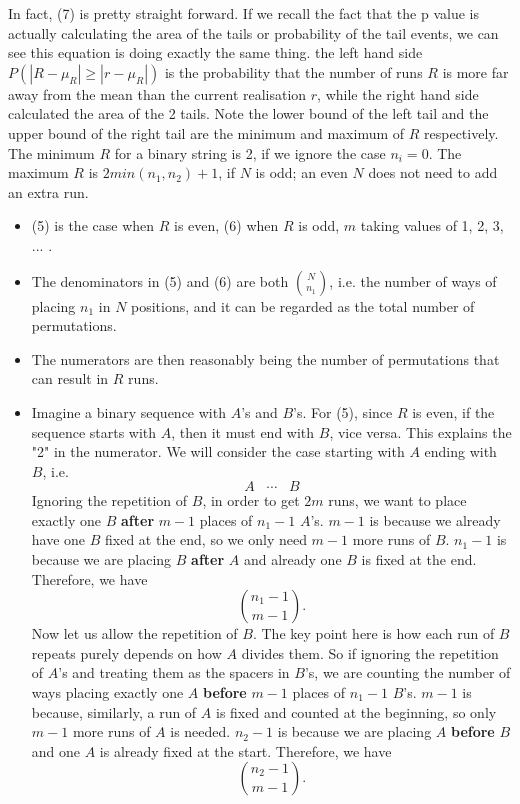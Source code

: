 \documentclass[12pt]{article}
\theoremstyle{plain}
\theoremstyle{definition}
\theoremstyle{remark}
\begin{document}
In fact, (7) is pretty straight forward. If we recall the fact that the p value is actually calculating the area of the tails or probability of the tail events, we can see this equation is doing exactly the same thing. the left hand side $P(|R-\mu_R|\ge|r-\mu_R|)$ is the probability that the number of runs $R$ is more far away from the mean than the current realisation $r$, while the right hand side calculated the area of the 2 tails. Note the lower bound of the left tail and the upper bound of the right tail are the minimum and maximum of $R$ respectively. The minimum $R$ for a binary string is 2, if we ignore the case $n_i=0$. The maximum $R$ is $2min(n_1,n_2)+1$, if $N$ is odd; an even $N$ does not need to add an extra run. 

\begin{itemize}
    \item (5) is the case when $R$ is even, (6) when $R$ is odd, $m$ taking values of 1, 2, 3, ... .
    \item The denominators in (5) and (6) are both $\binom{N}{n_1}$, i.e. the number of ways of placing $n_1$ in $N$ positions, and it can be regarded as the total number of permutations. 
    \item The numerators are then reasonably being the number of permutations that can result in $R$ runs.
    \item Imagine a binary sequence with $A$'s and $B$'s. For (5), since $R$ is even, if the sequence starts with $A$, then it must end with $B$, vice versa. This explains the "2" in the numerator. We will consider the case starting with $A$ ending with $B$, i.e. $$A\;\;\; \cdots \;\;\; B$$Ignoring the repetition of $B$, in order to get $2m$ runs, we want to place exactly one $B$ \textbf{after} $m-1$ places of $n_1-1$ $A$'s. $m-1$ is because we already have one $B$ fixed at the end, so we only need $m-1$ more runs of $B$. $n_1-1$ is because we are placing $B$ \textbf{after} $A$ and already one $B$ is fixed at the end. Therefore, we have $$\binom{n_1-1}{m-1}.$$ Now let us allow the repetition of $B$. The key point here is how each run of $B$ repeats purely depends on how $A$ divides them. So if ignoring the repetition of $A$'s and treating them as the spacers in $B$'s, we are counting the number of ways placing exactly one $A$ \textbf{before} $m-1$ places of $n_1-1$ $B$'s. $m-1$ is because, similarly, a run of $A$ is fixed and counted at the beginning, so only $m-1$ more runs of $A$ is needed. $n_2-1$ is because we are placing $A$ \textbf{before} $B$ and one $A$ is already fixed at the start. Therefore, we have $$\binom{n_2-1}{m-1}.$$

\end{itemize}
\end{document}
